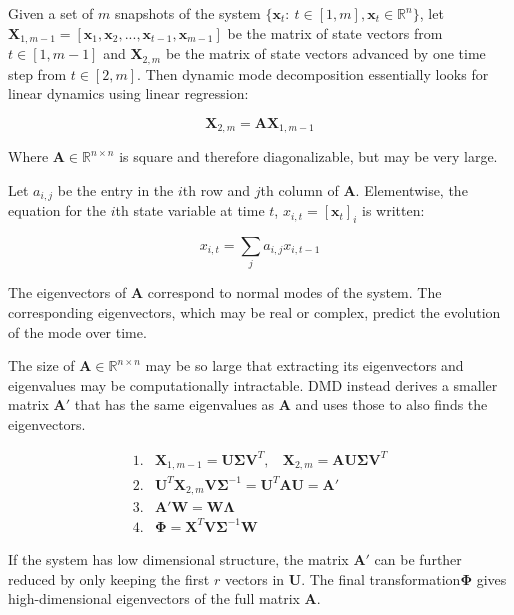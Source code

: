 Given a set of $m$ snapshots of the system $\{\mathbf{x}_t:\ t\in[1,m], \mathbf{x}_t \in \mathbb{R}^{n}\}$, let $\mathbf{X}_{1,m-1} = \left[\mathbf{x}_1,\mathbf{x}_2,...,\mathbf{x}_{t-1},\mathbf{x}_{m-1}\right]$ be the matrix of state vectors from $t\in[1,m-1]$ and $\mathbf{X}_{2,m}$ be the matrix of state vectors advanced by one time step from $t\in[2,m]$. Then dynamic mode decomposition essentially looks for linear dynamics using linear regression:

\begin{equation}
\mathbf{X}_{2,m} = \mathbf{A}\mathbf{X}_{1,m-1}
\end{equation}

Where $\mathbf{A} \in \mathbb{R}^{n\times n}$ is square and therefore diagonalizable, but may be very large.

Let $a_{i,j}$ be the entry in the $i$th row and $j$th column of $\mathbf{A}$. Elementwise, the equation for the $i$th state variable at time $t$, $x_{i,t} = [\mathbf{x}_t]_i$ is written:

\begin{equation}
x_{i,t} = \sum_j a_{i,j} x_{i,t-1}
\end{equation}

The eigenvectors of $\mathbf{A}$  correspond to normal modes of the system. The corresponding eigenvectors, which may be real or complex, predict the evolution of the mode over time.

The size of $\mathbf{A}\in\mathbb{R}^{n\times n}$ may be so large that extracting its eigenvectors and eigenvalues may be computationally intractable. DMD instead derives a smaller matrix $\mathbf{A'}$ that has the same eigenvalues as $\mathbf{A}$ and uses those to also finds the eigenvectors.

\begin{equation}
\begin{array}{ll}
1. & \mathbf{X}_{1,m-1} = \mathbf{U}\mathbf{\Sigma}\mathbf{V}^T,\ \ \ \ \mathbf{X}_{2,m} = \mathbf{AU\Sigma V}^T\\
2. & \mathbf{U}^T\mathbf{X}_{2,m}\mathbf{V\Sigma}^{-1} = \mathbf{U}^{T}\mathbf{AU} = \mathbf{A'}\\
3. & \mathbf{A'}\mathbf{W} = \mathbf{W}\mathbf{\Lambda} \\
4. & \mathbf{\Phi} = \mathbf{X}^T\mathbf{V\Sigma}^{-1}\mathbf{W}
\end{array}
\end{equation}
 
If the system has low dimensional structure, the matrix $\mathbf{A'}$ can be further reduced by only keeping the first $r$ vectors in $\mathbf{U}$. The final transformation$\mathbf{\Phi}$ gives high-dimensional eigenvectors of the full matrix $\mathbf{A}$. 

